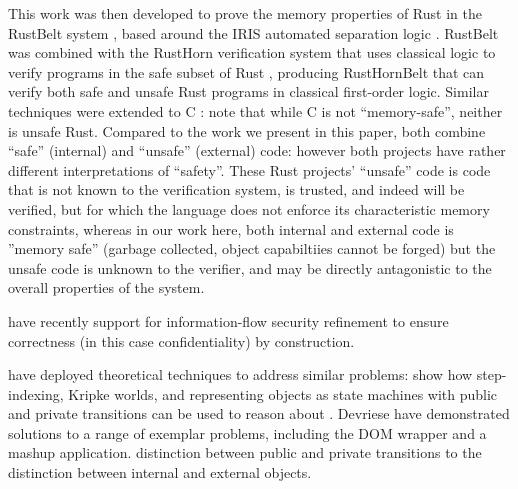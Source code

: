 This work was then developed to prove the memory properties of Rust in
the RustBelt system \cite{RustBelt18}, based around the IRIS automated
separation logic \cite{iris-jfp2018}.  RustBelt was combined with the
RustHorn verification system that uses classical logic 
 to verify
programs in the safe subset of Rust \cite{RustHorn-toplas2021},
producing RustHornBelt \cite{RustHornBelt-pldi2022} that can verify
both safe and unsafe Rust programs in classical first-order logic.
Similar techniques were extended to C \cite{RefinedC-pldi2021}:
note that while C is not ``memory-safe'', neither is unsafe Rust.
Compared to the work we present in this paper, both combine ``safe''
(internal) and ``unsafe'' (external) code: however both projects have
rather different interpretations of ``safety''.  These Rust projects'
``unsafe'' code is code that is not known to the verification system,
is trusted, and indeed will be verified, but for which the language
does not enforce its characteristic memory constraints, whereas in our
work here, both internal and external code is ''memory safe'' (garbage
collected, object capabiltiies cannot be forged) but the unsafe code
is unknown to the verifier, and may be directly antagonistic to the
overall properties of the system.



\citet{schaeferCbC} have recently
  support for information-flow security %
 refinement to ensure correctness (in this case confidentiality) by
construction. 





 
\citet{dd}  have deployed
  theoretical techniques to address similar problems:  %
   show how step-indexing, Kripke worlds, and representing objects
as state machines with public and private transitions can be used to
reason about %
.
Devriese have demonstrated solutions to a range of exemplar problems,
including the DOM wrapper and a mashup application.
 distinction
between public and private transitions %
 to the
distinction between internal and external objects.



